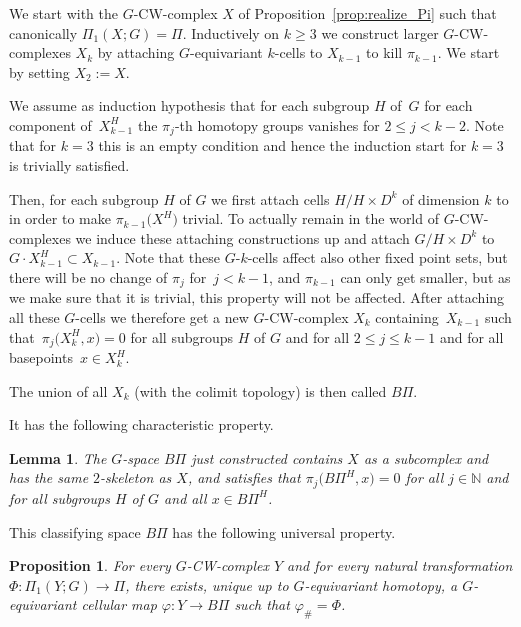 \documentclass[pdftex]{sigma}
\numberwithin{equation}{section}
\newtheorem{Lemma}[Theorem]{Lemma}
\newtheorem{Proposition}[Theorem]{Proposition}
{ \theoremstyle{definition}
	\newtheorem{Definition}[Theorem]{Definition}
	\newtheorem{Note}[Theorem]{Note}
	\newtheorem{Example}[Theorem]{Example}
	\newtheorem{Remark}[Theorem]{Remark} }
\def\NN{\ensuremath{\mathbb{N}}}
\begin{document}
We start with the $G$-CW-complex $X$ of Proposition~\ref{prop:realize_Pi} such
	that canonically $\Pi_1(X;G)=\Pi$.
	Inductively on $k\ge 3$ we construct larger $G$-CW-complexes $X_k$
	by attaching $G$-equivariant $k$-cells to $X_{k-1}$ to kill $\pi_{k-1}$. We start
	by setting $X_2:= X$.
	
	We assume as induction hypothesis that for each subgroup $H$ of~$G$ for each
	component of~$X_{k-1}^H$ the $\pi_j$-th homotopy groups vanishes for $2\le
	j<k-2$. Note that for $k=3$ this is an empty condition and hence the induction
	start for $k=3$ is trivially satisfied.
	
	Then, for each subgroup $H$ of $G$ we first attach
	cells $H/H\times D^k$ of dimension $k$ to  in order to make
	$\pi_{k-1}\bigl(X^H\bigr)$
	trivial. To actually remain in the world of $G$-CW-complexes we induce these
	attaching constructions up and attach $G/H\times D^k$ to $G\cdot
	X_{k-1}^H\subset X_{k-1}$. Note that these $G$-$k$-cells affect also other
	fixed point sets, but there will be no change of $\pi_j$ for~${j<k-1}$, and
	$\pi_{k-1}$ can only get smaller, but as we make sure that it is trivial,
	this property will not be affected. After attaching all these $G$-cells we
	therefore get a new $G$-CW-complex $X_k$ containing~$X_{k-1}$ such that~${\pi_j\bigl(X_k^H,x\bigr)=0}$ for all subgroups $H$ of $G$ and for all $2\le j\le
	k-1$ and for all basepoints~${x\in X_k^H}$.
	
	\begin{Definition}
		The union of all $X_k$ (with the colimit topology) is then called $B\Pi$.
	\end{Definition}
	
	It has the following characteristic property.

	\begin{Lemma}
		The $G$-space $B\Pi$ just constructed contains $X$ as a subcomplex and has the
		same $2$-skeleton as $X$, and
		satisfies that $\pi_j\bigl(B\Pi^H,x\bigr)=0$ for all $j\in\NN$ and for all subgroups
		$H$ of $G$ and all $x\in B\Pi^H$.
	\end{Lemma}
	
	
	This classifying space
	$B\Pi$ has the following universal property.
	
	\begin{Proposition}\label{universalspace}
		For every $G$-CW-complex $Y$ and for every natural transformation $\Phi\colon
		\Pi_1(Y;\allowbreak G)\to \Pi$, there exists, unique up to $G$-equivariant
		homotopy, a $G$-equivariant cellular map
		$\varphi\colon Y\to B \Pi$
		such that
		$\varphi_{\#}=\Phi$.
	\end{Proposition}
	
\end{document}
